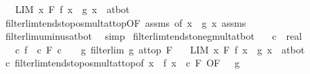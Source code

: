 \begin{isabellebody}
\ \ \ {\isachardoublequoteopen}LIM\ x\ F{\isachardot}{\kern0pt}\ f\ x\ {\isacharasterisk}{\kern0pt}\ g\ x\ {\isacharcolon}{\kern0pt}{\isachargreater}{\kern0pt}\ at{\isacharunderscore}{\kern0pt}bot{\isachardoublequoteclose}\isanewline
%
\isadelimproof
\ \ %
\endisadelimproof
%
\isatagproof
{}\isamarkupfalse%
\ filterlim{\isacharunderscore}{\kern0pt}tendsto{\isacharunderscore}{\kern0pt}pos{\isacharunderscore}{\kern0pt}mult{\isacharunderscore}{\kern0pt}at{\isacharunderscore}{\kern0pt}top{\isacharbrackleft}{\kern0pt}OF\ assms{\isacharparenleft}{\kern0pt}{}{\isacharcomma}{\kern0pt}{}{\isacharparenright}{\kern0pt}{\isacharcomma}{\kern0pt}\ of\ {\isachardoublequoteopen}{\isasymlambda}x{\isachardot}{\kern0pt}\ {\isacharminus}{\kern0pt}\ g\ x{\isachardoublequoteclose}{\isacharbrackright}{\kern0pt}\ assms{\isacharparenleft}{\kern0pt}{}{\isacharparenright}{\kern0pt}\isanewline
\ \ \isamarkupfalse%
\ filterlim{\isacharunderscore}{\kern0pt}uminus{\isacharunderscore}{\kern0pt}at{\isacharunderscore}{\kern0pt}bot\ \isamarkupfalse%
\ simp%
\endisatagproof
{\isafoldproof}%
%
\isadelimproof
\isanewline
%
\endisadelimproof
\isanewline
{}\isamarkupfalse%
\ filterlim{\isacharunderscore}{\kern0pt}tendsto{\isacharunderscore}{\kern0pt}neg{\isacharunderscore}{\kern0pt}mult{\isacharunderscore}{\kern0pt}at{\isacharunderscore}{\kern0pt}bot{\isacharcolon}{\kern0pt}\isanewline
\ \ \ c\ {\isacharcolon}{\kern0pt}{\isacharcolon}{\kern0pt}\ real\isanewline
\ \ \ c{\isacharcolon}{\kern0pt}\ {\isachardoublequoteopen}{\isacharparenleft}{\kern0pt}f\ {\isasymlonglongrightarrow}\ c{\isacharparenright}{\kern0pt}\ F{\isachardoublequoteclose}\ {\isachardoublequoteopen}c\ {\isacharless}{\kern0pt}\ {}{\isachardoublequoteclose}\ \ g{\isacharcolon}{\kern0pt}\ {\isachardoublequoteopen}filterlim\ g\ at{\isacharunderscore}{\kern0pt}top\ F{\isachardoublequoteclose}\isanewline
\ \ \ {\isachardoublequoteopen}LIM\ x\ F{\isachardot}{\kern0pt}\ f\ x\ {\isacharasterisk}{\kern0pt}\ g\ x\ {\isacharcolon}{\kern0pt}{\isachargreater}{\kern0pt}\ at{\isacharunderscore}{\kern0pt}bot{\isachardoublequoteclose}\isanewline
%
\isadelimproof
\ \ %
\endisadelimproof
%
\isatagproof
{}\isamarkupfalse%
\ c\ filterlim{\isacharunderscore}{\kern0pt}tendsto{\isacharunderscore}{\kern0pt}pos{\isacharunderscore}{\kern0pt}mult{\isacharunderscore}{\kern0pt}at{\isacharunderscore}{\kern0pt}top{\isacharbrackleft}{\kern0pt}of\ {\isachardoublequoteopen}{\isasymlambda}x{\isachardot}{\kern0pt}\ {\isacharminus}{\kern0pt}\ f\ x{\isachardoublequoteclose}\ {\isachardoublequoteopen}{\isacharminus}{\kern0pt}\ c{\isachardoublequoteclose}\ F{\isacharcomma}{\kern0pt}\ OF\ {\isacharunderscore}{\kern0pt}\ {\isacharunderscore}{\kern0pt}\ g{\isacharbrackright}{\kern0pt}\isanewline

\end{isabellebody}
